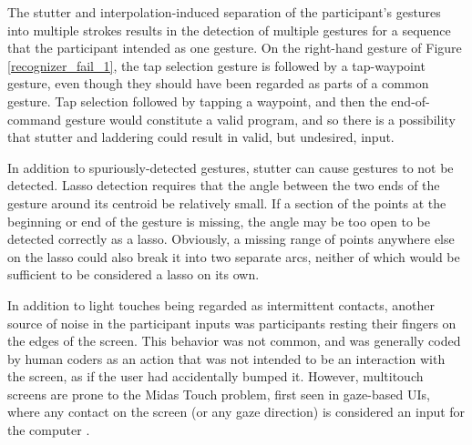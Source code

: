 The stutter and interpolation-induced separation of the  participant's gestures into multiple strokes results in the detection of multiple gestures for a sequence that the participant intended as one gesture. 
On the right-hand gesture of Figure \ref{recognizer_fail_1}, the tap selection gesture is followed by a tap-waypoint gesture, even though they should have been regarded as parts of a common gesture. 
Tap selection followed by tapping a waypoint, and then the end-of-command gesture would constitute a valid program, and so there is a possibility that stutter and laddering could result in valid, but undesired, input. 

In addition to spuriously-detected gestures, stutter can cause gestures to not be detected. 
Lasso detection requires that the angle between the two ends of the gesture around its centroid be relatively small. 
If a section of the points at the beginning or end of the gesture is missing, the angle may be too open to be detected correctly as a lasso. 
Obviously, a missing range of points anywhere else on the lasso could also break it into two separate arcs, neither of which would be sufficient to be considered a lasso on its own. 

In addition to light touches being regarded as intermittent contacts, another source of noise in the participant inputs was participants resting their fingers on the edges of the screen. 
This behavior was not common, and was generally coded by human coders as an action that was not intended to be an interaction with the screen, as if the user had accidentally bumped it. 
However, multitouch screens are prone to the Midas Touch problem, first seen in gaze-based UIs, where any contact on the screen (or any gaze direction) is considered an input for the computer \citep{jacob1990you}. 

